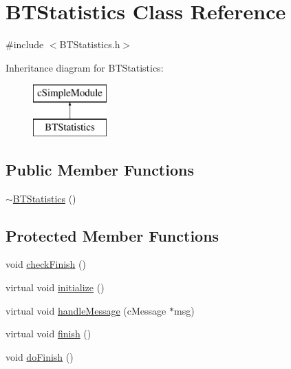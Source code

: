 \hypertarget{classBTStatistics}{}\section{B\+T\+Statistics Class Reference}
\label{classBTStatistics}


{\ttfamily \#include $<$B\+T\+Statistics.\+h$>$}

Inheritance diagram for B\+T\+Statistics\+:\begin{figure}[H]
\begin{center}
\leavevmode
\includegraphics[height=2.000000cm]{classBTStatistics}
\end{center}
\end{figure}
\subsection*{Public Member Functions}
\begin{DoxyCompactItemize}
\item 
\hyperlink{classBTStatistics_ac45d4907a45437ff46e22673663e3039}{$\sim$\+B\+T\+Statistics} ()
\end{DoxyCompactItemize}
\subsection*{Protected Member Functions}
\begin{DoxyCompactItemize}
\item 
void \hyperlink{classBTStatistics_a019a72be755d8da5fe55096fc9859780}{check\+Finish} ()
\item 
virtual void \hyperlink{classBTStatistics_ade8599c76eddd32a9de2b147ad206a5c}{initialize} ()
\item 
virtual void \hyperlink{classBTStatistics_aa8d25bd062c2338cae68e798496c8f41}{handle\+Message} (c\+Message $\ast$msg)
\item 
virtual void \hyperlink{classBTStatistics_a79818ddd3f1e516bbf5dc34c7ff2aee4}{finish} ()
\item 
void \hyperlink{classBTStatistics_a7c2bd895d14a2b266847284e21293422}{do\+Finish} ()
\end{DoxyCompactItemize}
